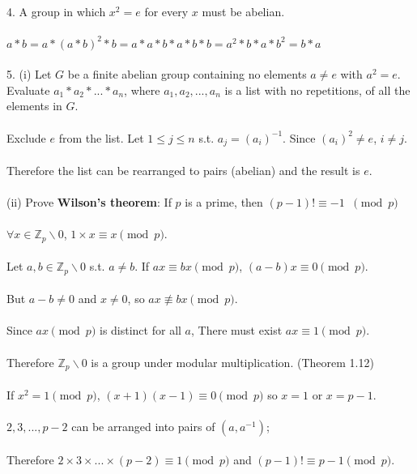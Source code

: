 \documentclass{article}
\begin{document}
\begin{siderules}
\color{blue}4. A group in which \(x^{2}=e\) for every \(x\) must be abelian.\\\\\color{black}
\null\qquad \(a*b=a*(a*b)^{2}*b=a*a*b*a*b*b=a^{2}*b*a*b^{2}=b*a\)\\\\
\color{blue}5. (i) Let \(G\) be a finite abelian group containing no elements \(a\neq e\) with \(a^{2}=e\). Evaluate \(a_{1}*a_{2}*...*a_{n}\), where \(a_{1},a_{2},...,a_{n}\) is a list with no repetitions, of all the elements in \(G\).\\\\\color{black}
\null\qquad Exclude \(e\) from the list. Let \(1\le j\le n\) s.t. \(a_{j}=(a_{i})^{-1}\). Since \((a_{i})^{2}\neq e\), \(i\neq j\).\\\\
\null\qquad Therefore the list can be rearranged to pairs (abelian) and the result is \(e\).\\\\
\color{blue}(ii) Prove \textbf{Wilson's theorem}: If \(p\) is a prime, then \((p-1)!\equiv -1\;\;\pmod p\)\\\\\color{black}
\null\qquad \(\forall x\in\mathbb{Z}_{p}\backslash 0\), \(1\times x\equiv x\pmod p\).\\\\
\null\qquad Let \(a,b\in\mathbb{Z}_{p}\backslash 0\) s.t. \(a\neq b\). If \(ax\equiv bx\pmod p\), \((a-b)x\equiv 0\pmod p\).\\\\
\null\qquad But \(a-b\neq 0\) and \(x\neq 0\), so \(ax\not\equiv bx\pmod p\).\\\\
\null\qquad Since \(ax\pmod p\) is distinct for all \(a\), There must exist \(ax\equiv 1\pmod p\).\\\\
\null\qquad Therefore \(\mathbb{Z}_{p}\backslash 0\) is a group under modular multiplication. \color{gray}(Theorem 1.12) \color{black}\\\\
\null\qquad If \(x^2=1\pmod p\), \((x+1)(x-1)\equiv 0\pmod p\) so \(x=1\) or \(x=p-1\).\\\\
\null\qquad \(2,3,...,p-2\) can be arranged into pairs of \((a,a^{-1})\);\\\\
\null\qquad Therefore \(2\times 3\times ...\times(p-2)\equiv 1\pmod p\) and \((p-1)!\equiv p-1\pmod p\).\\\\

\end{siderules}
\end{document}
